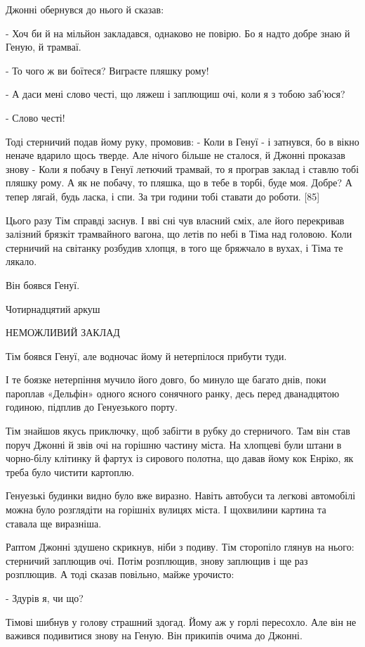 Джонні обернувся до нього й сказав:

- Хоч би й на мільйон закладався, однаково не повірю. Бо я надто добре знаю й Геную, й трамваї.

- То чого ж ви боїтеся? Виграєте пляшку рому!

- А даси мені слово честі, що ляжеш і заплющиш очі, коли я з тобою заб'юся?

- Слово честі!

Тоді стерничий подав йому руку, промовив: - Коли в Генуї - і затнувся, бо в вікно неначе вдарило щось тверде. Але нічого більше не сталося, й Джонні проказав знову - Коли я побачу в Генуї летючий трамвай, то я програв заклад і ставлю тобі пляшку рому. А як не побачу, то пляшка, що в тебе в торбі, буде моя. Добре? А тепер лягай, будь ласка, і спи. За три години тобі ставати до роботи. [85]

Цього разу Тім справді заснув. І вві сні чув власний сміх, але його перекривав залізний брязкіт трамвайного вагона, що летів по небі в Тіма над головою. Коли стерничий на світанку розбудив хлопця, в того ще бряжчало в вухах, і Тіма те лякало.

Він боявся Генуї.

Чотирнадцятий аркуш

НЕМОЖЛИВИЙ ЗАКЛАД

Тім боявся Генуї, але водночас йому й нетерпілося прибути туди.

І те боязке нетерпіння мучило його довго, бо минуло ще багато днів, поки пароплав «Дельфін» одного ясного сонячного ранку, десь перед дванадцятою годиною, підплив до Генуезького порту.

Тім знайшов якусь приключку, щоб забігти в рубку до стерничого. Там він став поруч Джонні й звів очі на горішню частину міста. На хлопцеві були штани в чорно-білу клітинку й фартух із сирового полотна, що давав йому кок Енріко, як треба було чистити картоплю.

Генуезькі будинки видно було вже виразно. Навіть автобуси та легкові автомобілі можна було розглядіти на горішніх вулицях міста. І щохвилини картина та ставала ще виразніша.

Раптом Джонні здушено скрикнув, ніби з подиву. Тім сторопіло глянув на нього: стерничий заплющив очі. Потім розплющив, знову заплющив і ще раз розплющив. А тоді сказав повільно, майже урочисто:

- Здурів я, чи що?

Тімові шибнув у голову страшний здогад. Йому аж у горлі пересохло. Але він не важився подивитися знову на Геную. Він прикипів очима до Джонні.

